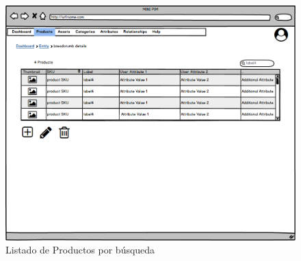 \begin{figure}[H]
    \includegraphics[width=1\linewidth]{mockups/RF2- Gestión General de Productos (listado por búsqueda).png}
    \caption{Listado de Productos por búsqueda}
   \end{figure}
\vspace{1.0cm}

\newpage %